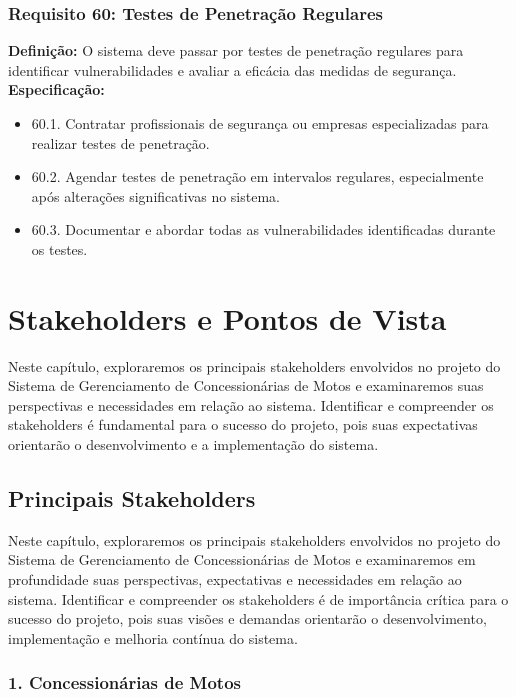 \subsubsection{Requisito 60: Testes de Penetração Regulares}
\textbf{Definição:} O sistema deve passar por testes de penetração regulares para identificar vulnerabilidades e avaliar a eficácia das medidas de segurança.
\\
\textbf{Especificação:}
\begin{itemize}
	\item 60.1. Contratar profissionais de segurança ou empresas especializadas para realizar testes de penetração.
	\item 60.2. Agendar testes de penetração em intervalos regulares, especialmente após alterações significativas no sistema.
	\item 60.3. Documentar e abordar todas as vulnerabilidades identificadas durante os testes.
\end{itemize}


\section{Stakeholders e Pontos de Vista}

Neste capítulo, exploraremos os principais stakeholders envolvidos no projeto do Sistema de Gerenciamento de Concessionárias de Motos e examinaremos suas perspectivas e necessidades em relação ao sistema. Identificar e compreender os stakeholders é fundamental para o sucesso do projeto, pois suas expectativas orientarão o desenvolvimento e a implementação do sistema.

\subsection{Principais Stakeholders}

Neste capítulo, exploraremos os principais stakeholders envolvidos no projeto do Sistema de Gerenciamento de Concessionárias de Motos e examinaremos em profundidade suas perspectivas, expectativas e necessidades em relação ao sistema. Identificar e compreender os stakeholders é de importância crítica para o sucesso do projeto, pois suas visões e demandas orientarão o desenvolvimento, implementação e melhoria contínua do sistema.

\subsubsection{1. Concessionárias de Motos}

